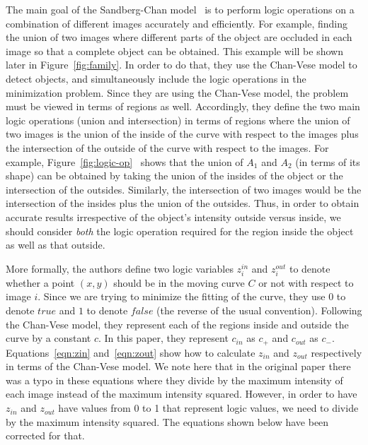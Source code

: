 \documentclass[10pt,twocolumn,letterpaper]{article}
\begin{document}
The main goal of the Sandberg-Chan model~\cite{sandberg2005logic} is to perform logic operations on a combination of different images accurately and
efficiently. For example, finding the union of two images where different parts of the object are occluded in each image so that a complete object can be
obtained. This example will be shown later in Figure~\ref{fig:family}. In order to do that, they use the Chan-Vese model to detect objects, and simultaneously
include the logic operations in the minimization problem.
Since they are using the Chan-Vese model, the problem must be viewed in terms of regions as well. Accordingly, they define the two main logic operations
(union and intersection) in terms of regions where the union of two images is the union of the inside of the curve with respect to the images plus the
intersection of the outside of the curve with respect to the images. For example, Figure~\ref{fig:logic-op}~\cite{sandberg2005logic} shows that the
union of $A_{1}$ and $A_{2}$ (in terms of its shape) can be obtained by taking the union of the insides of the object or the intersection of the outsides.
Similarly, the intersection of two images would be the intersection of the insides plus the union of the outsides. Thus, in order to obtain accurate results
irrespective of the object's intensity outside versus inside, we should consider \textit{both} the logic operation required for the region inside the object
as well as that outside.



More formally, the authors define two logic variables $z_{i}^{in}$ and $z_{i}^{out}$ to denote whether a point $(x,y)$ should be in the moving curve $C$ or not
with respect to image $i$. Since we are trying to minimize the fitting of the curve, they use $0$ to denote $true$ and $1$ to denote $false$ (the reverse of the
usual
convention). Following the Chan-Vese model, they represent each of the regions inside and outside the curve by a constant $c$. In this paper, they represent
$c_{in}$ as $c_{+}$ and $c_{out}$ as $c_{-}$. Equations~\ref{eqn:zin} and~\ref{eqn:zout} show how to calculate $z_{in}$ and $z_{out}$ respectively in terms of
the Chan-Vese model. We note here that in the original paper there was a typo in these equations where they divide by the maximum intensity of each image
instead of the maximum intensity squared. However, in order to have $z_{in}$ and $z_{out}$ have values from 0 to 1 that represent logic values, we need to
divide by the maximum intensity squared. The equations shown below have been corrected for that.
\end{document}
